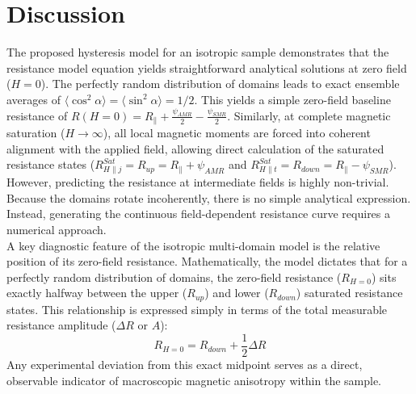 \documentclass[11pt,a4paper]{article}
\begin{document}
\section{Discussion}
The proposed hysteresis model for an isotropic sample demonstrates that the resistance model equation yields straightforward analytical solutions at zero field ($H=0$). The perfectly random distribution of domains leads to exact ensemble averages of $\langle \cos^2\alpha \rangle = \langle \sin^2\alpha \rangle = 1/2$. This yields a simple zero-field baseline resistance of $R(H=0) = R_{\parallel} + \frac{\psi_{AMR}}{2} - \frac{\psi_{SMR}}{2}$. Similarly, at complete magnetic saturation ($H \to \infty$), all local magnetic moments are forced into coherent alignment with the applied field, allowing direct calculation of the saturated resistance states ($R_{H \parallel j}^{Sat}=R_{up}= R_{\parallel} + \psi_{AMR}$ and $R_{H \parallel t}^{Sat} = R_{down}=R_{\parallel} - \psi_{SMR}$). However, predicting the resistance at intermediate fields is highly non-trivial. Because the domains rotate incoherently, there is no simple analytical expression. Instead, generating the continuous field-dependent resistance curve requires a numerical approach.\\
A key diagnostic feature of the isotropic multi-domain model is the relative position of its zero-field resistance. Mathematically, the model dictates that for a perfectly random distribution of domains, the zero-field resistance ($R_{H=0}$) sits exactly halfway between the upper ($R_{up}$) and lower ($R_{down}$) saturated resistance states. This relationship is expressed simply in terms of the total measurable resistance amplitude ($\Delta R$ or $A$):
\begin{equation}
R_{H=0} = R_{down} + \frac{1}{2}\Delta R
\end{equation}
Any experimental deviation from this exact midpoint serves as a direct, observable indicator of macroscopic magnetic anisotropy within the sample.\\
\end{document}
